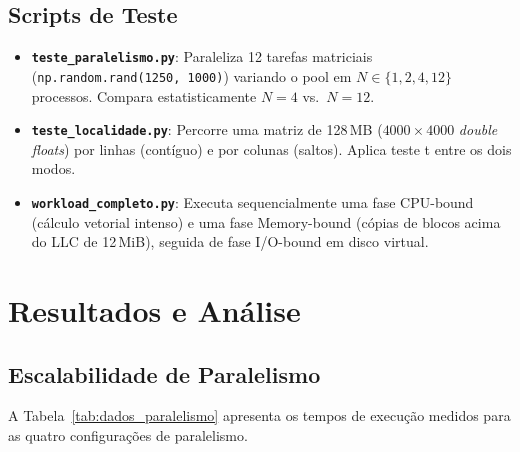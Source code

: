 \documentclass[
	12pt,
	openright,
	oneside,
	a4paper,
	english,
	brazil
	]{abntex2}
\begin{document}
\section{Scripts de Teste}
\label{sec:scripts}

\begin{itemize}
    \item \textbf{\texttt{teste\_paralelismo.py}}: Paraleliza 12 tarefas matriciais (\texttt{np.random.rand(1250, 1000)}) variando o pool em $N \in \{1, 2, 4, 12\}$ processos. Compara estatisticamente $N=4$ vs.\ $N=12$.
    \item \textbf{\texttt{teste\_localidade.py}}: Percorre uma matriz de 128\,MB ($4000 \times 4000$ \textit{double floats}) por linhas (contíguo) e por colunas (saltos). Aplica teste t entre os dois modos.
    \item \textbf{\texttt{workload\_completo.py}}: Executa sequencialmente uma fase CPU-bound (cálculo vetorial intenso) e uma fase Memory-bound (cópias de blocos acima do LLC de 12\,MiB), seguida de fase I/O-bound em disco virtual.
\end{itemize}

\chapter{Resultados e Análise}
\label{chap:resultados}

\section{Escalabilidade de Paralelismo}
\label{sec:resultados_paralelismo}

A Tabela~\ref{tab:dados_paralelismo} apresenta os tempos de execução medidos para as quatro configurações de paralelismo.

\begin{table}[htb]
\centering
\caption{Tempos de execução sob escala de paralelismo ($N = 30$)}
\label{tab:dados_paralelismo}
\small
{}
\end{table}
\end{document}
